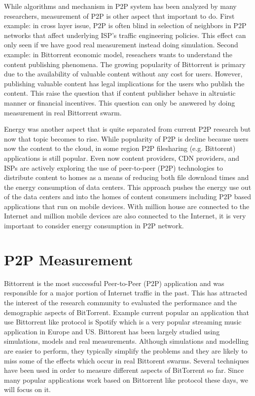 While algorithms and mechanism in P2P system has been analyzed by many researchers, measurement of P2P is other aspect that important to do. 
First example: in cross layer issue, P2P is often blind in selection of neighbors in P2P networks that affect underlying ISP's traffic engineering policies.  
This effect can only seen if we have good real measurement instead doing simulation.
Second example: in Bittorrent economic model, reseachers wants to understand the content publishing phenomena. 
The growing popularity of Bittorrent is primary due to the availability of valuable content without any cost for users.
However, publishing valuable content has legal implications for the users who publish the content.
This raise the question that if content publisher behave in altruistic manner or financial incentives. 
This question can only be answered by doing measurement in real Bittorrent swarm. 

Energy was another aspect that is quite separated from current P2P research but now that topic becomes to rise. 
While popularity of P2P is decline because users now the content to the cloud, in some region P2P filesharing (e.g. Bittorent) applications is still popular.
Even now content providers, CDN providers, and ISPs are actively exploring the use of peer-to-peer (P2P) technologies to distribute content to homes as a means of reducing both file download times and the energy consumption of data centers. 
This approach pushes the energy use out of the data centers and into the homes of content consumers including P2P based applications that run on mobile devices.
With million house are connected to the Internet and million mobile devices are also connected to the Internet, it is very important to consider energy consumption in P2P network.


\section{P2P Measurement}

Bittorrent is the most successful Peer-to-Peer (P2P) application and was responsible for a major portion of Internet traffic in the past.
This has attracted the interest of the research community to evaluated the performance and the demographic aspects of BitTorrent.
Example current popular an application that use Bittorrent like protocol is Spotify which is a very popular streaming music application in Europe and US.
Bittorent has been largely studied using simulations, models and real measurements. 
Although simulations and modelling are easier to perform, they typically simplify the problems and they are likely to miss some of the effects which occur in real Bittorent swarms. 
Several techniques have been used in order to measure different aspects of BitTorrent so far. 
Since many popular applications work based on Bittorrent like protocol these days, we will focus on it.

